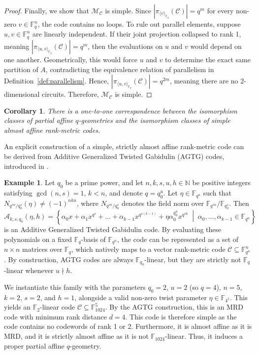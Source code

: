 \documentclass[a4paper,11pt,reqno]{article}
\newcommand{\F}{\mathbb{F}}
\newcommand{\C}{\mathcal{C}}
\theoremstyle{plain} \numberwithin{equation}{section}
\newtheorem{corollary}[theorem]{Corollary}
\theoremstyle{definition}
\newtheorem{example}[theorem]{Example}
\begin{document}
\begin{proof}
    Finally, we show that $\mathcal{M}_{\mathcal{C}}$ is simple. Since $|\pi_{\langle v \rangle_{\F_q}}(\mathcal{C})| = q^m$ for every non-zero $v \in \F_q^n$, the code contains no loops. To rule out parallel elements, suppose $u, v \in \F_q^n$ are linearly independent. If their joint projection collapsed to rank 1, meaning $|\pi_{\langle u, v \rangle_{\F_q}}(\mathcal{C})| = q^m$, then the evaluations on $u$ and $v$ would depend on one another. Geometrically, this would force $u$ and $v$ to determine the exact same partition of $A$, contradicting the equivalence relation of parallelism in Definition~\ref{def:parallelism}. Hence, $|\pi_{\langle u, v \rangle_{\F_q}}(\mathcal{C})| = q^{2m}$, meaning there are no 2-dimensional circuits. Therefore, $\mathcal{M}_{\mathcal{C}}$ is simple.
\end{proof}


\begin{corollary}
    There is a one-to-one correspondence between the isomorphism classes of partial affine $q$-geometries and the isomorphism classes of simple almost affine rank-metric codes. \label{cor:equivalencegeometry}
\end{corollary}

An explicit construction of a simple, strictly almost affine rank-metric code can be derived from Additive Generalized Twisted Gabidulin (AGTG) codes, introduced in \cite{additiverankmetriccodes}.

\begin{example}
Let $q_0$ be a prime power, and let $n,k,s,u,h\in \mathbb{N}$ be positive integers satisfying $\gcd(n,s)=1$, $k<n$, and denote $q=q_0^u$. Let $\eta\in \F_{q^n}$ such that $N_{q^{sn}/q_0^s}(\eta) \neq (-1)^{nku}$, where $N_{q^{sn}/q_0^s}$ denotes the field norm over $\F_{q^{sn}}/\F_{q_0^s}$. Then 
\[
    \mathcal{A}_{k,s,q_0}(\eta,h) = \left\{ \alpha_0 x +\alpha_1 x^{q^s} + \ldots + \alpha_{k-1}x^{q^{s(k-1)}} + \eta \alpha_0^{q^h_0}x^{q^{sk}} \;\middle|\; \alpha_0,\ldots,\alpha_{k-1}\in \F_{q^n} \right\}
\]
is an Additive Generalized Twisted Gabidulin code. By evaluating these polynomials on a fixed $\F_q$-basis of $\F_{q^n}$, the code can be represented as a set of $n\times n$ matrices over $\F_q$, which natively maps to a vector rank-metric code $\C\subseteq \F_{q^n}^n$. By construction, AGTG codes are always $\F_{q_0}$-linear, but they are strictly not $\F_q$-linear whenever $u\nmid h$.

We instantiate this family with the parameters $q_0=2$, $u=2$ (so $q=4$), $n=5$, $k=2$, $s=2$, and $h=1$, alongside a valid non-zero twist parameter $\eta\in \F_{4^5}$. This yields an $\F_2$-linear code $\C\subseteq \F_{1024}^5$. By the AGTG construction, this is an MRD code with minimum rank distance $d=4$. This code is therefore simple as the code contains no codewords of rank 1 or 2. Furthermore, it is almost affine as it is MRD, and it is strictly almost affine as it is not $\F_{1024}$-linear. Thus, it induces a proper partial affine $q$-geometry. \label{exmp:AGTG}
\end{example}
\end{document}
